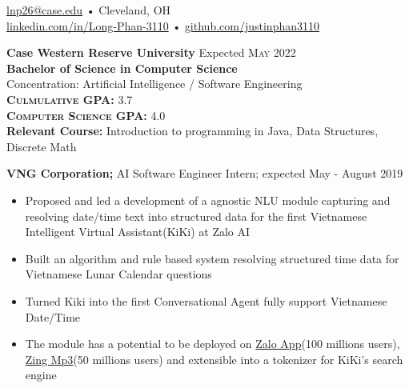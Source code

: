 \documentclass[a4paper,11pt]{article}
\begin{document}
 
 
\begin{center} 
\href{mailto:lnp26@case.edu}{lnp26@case.edu} • Cleveland, OH \\
\href{https://linkedin.com/in/Long-Phan-3110/}{linkedin.com/in/Long-Phan-3110} • \href{http://github.com/justinphan3110}{github.com/justinphan3110}
\noindent\makebox[\linewidth]{\rule{\paperwidth}{2pt}}
\end{center}

\begin{flushleft}
	\textbf{Case Western Reserve University } \hspace{1cm} Expected \textsc{May} 2022 \\
	\textbf{Bachelor of Science in Computer Science} \\
	Concentration: Artificial Intelligence / Software Engineering \\
	\textbf{\textsc{Culmulative GPA:}} 3.7 \\
	\textbf{\textsc{Computer Science GPA:}} 4.0 \\ 
	\textbf{Relevant Course:} Introduction to programming in Java, Data Structures, Discrete Math \\
	\centering{\noindent\makebox{\rule{8cm}{1.5pt}}}
\end{flushleft}

\begin{flushleft}
	\textbf{VNG Corporation; } AI Software Engineer Intern; expected May - August 2019 \\
	\vspace{-\topsep}
	\begin{itemize}
		\setlength{\parskip}{0pt}
		\setlength{\itemsep}{0pt plus 1pt}
		\item Proposed and led a development of a agnostic NLU module capturing and resolving date/time text into structured data for the first Vietnamese Intelligent Virtual Assistant(KiKi) at Zalo AI  
		\item Built an algorithm and rule based system resolving structured time data for Vietnamese Lunar Calendar questions  
		\item Turned Kiki into the first Conversational Agent fully support Vietnamese Date/Time 
		\item  The module has a potential to be deployed on  \href{https://oa.zalo.me/home}{Zalo App}(100 millions users),  \href{https://mp3.zing.vn/}{Zing Mp3}(50 millions users) and extensible into a tokenizer for KiKi's search engine
	\end{itemize}
\vspace{-\topsep}
\centering{\noindent\makebox{\rule{8cm}{1.5pt}}}
\end{flushleft} 
\end{document}
